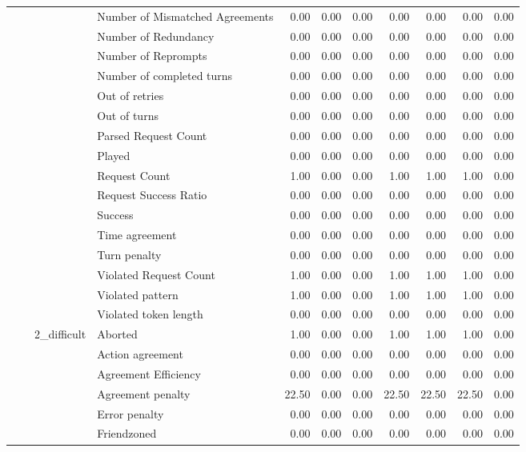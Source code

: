 \begin{tabular}{llllrrrrrrr}
 &  &  & Number of Mismatched Agreements & 0.00 & 0.00 & 0.00 & 0.00 & 0.00 & 0.00 & 0.00 \\
 &  &  & Number of Redundancy & 0.00 & 0.00 & 0.00 & 0.00 & 0.00 & 0.00 & 0.00 \\
 &  &  & Number of Reprompts & 0.00 & 0.00 & 0.00 & 0.00 & 0.00 & 0.00 & 0.00 \\
 &  &  & Number of completed turns & 0.00 & 0.00 & 0.00 & 0.00 & 0.00 & 0.00 & 0.00 \\
 &  &  & Out of retries & 0.00 & 0.00 & 0.00 & 0.00 & 0.00 & 0.00 & 0.00 \\
 &  &  & Out of turns & 0.00 & 0.00 & 0.00 & 0.00 & 0.00 & 0.00 & 0.00 \\
 &  &  & Parsed Request Count & 0.00 & 0.00 & 0.00 & 0.00 & 0.00 & 0.00 & 0.00 \\
 &  &  & Played & 0.00 & 0.00 & 0.00 & 0.00 & 0.00 & 0.00 & 0.00 \\
 &  &  & Request Count & 1.00 & 0.00 & 0.00 & 1.00 & 1.00 & 1.00 & 0.00 \\
 &  &  & Request Success Ratio & 0.00 & 0.00 & 0.00 & 0.00 & 0.00 & 0.00 & 0.00 \\
 &  &  & Success & 0.00 & 0.00 & 0.00 & 0.00 & 0.00 & 0.00 & 0.00 \\
 &  &  & Time agreement & 0.00 & 0.00 & 0.00 & 0.00 & 0.00 & 0.00 & 0.00 \\
 &  &  & Turn penalty & 0.00 & 0.00 & 0.00 & 0.00 & 0.00 & 0.00 & 0.00 \\
 &  &  & Violated Request Count & 1.00 & 0.00 & 0.00 & 1.00 & 1.00 & 1.00 & 0.00 \\
 &  &  & Violated pattern & 1.00 & 0.00 & 0.00 & 1.00 & 1.00 & 1.00 & 0.00 \\
 &  &  & Violated token length & 0.00 & 0.00 & 0.00 & 0.00 & 0.00 & 0.00 & 0.00 \\
\cline{3-11}
 &  & \multirow[t]{27}{*}{2_difficult} & Aborted & 1.00 & 0.00 & 0.00 & 1.00 & 1.00 & 1.00 & 0.00 \\
 &  &  & Action agreement & 0.00 & 0.00 & 0.00 & 0.00 & 0.00 & 0.00 & 0.00 \\
 &  &  & Agreement Efficiency & 0.00 & 0.00 & 0.00 & 0.00 & 0.00 & 0.00 & 0.00 \\
 &  &  & Agreement penalty & 22.50 & 0.00 & 0.00 & 22.50 & 22.50 & 22.50 & 0.00 \\
 &  &  & Error penalty & 0.00 & 0.00 & 0.00 & 0.00 & 0.00 & 0.00 & 0.00 \\
 &  &  & Friendzoned & 0.00 & 0.00 & 0.00 & 0.00 & 0.00 & 0.00 & 0.00 \\

\end{tabular}
